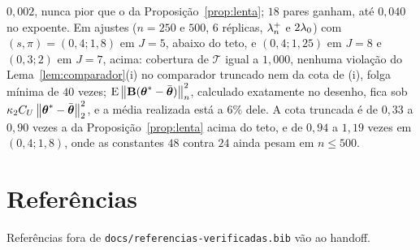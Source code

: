 \documentclass[11pt,a4paper]{article}
\newcommand{\Bmat}{\mathbf{B}}
\newcommand{\thbar}{\bar{\btheta}}
\begin{document}
\begin{itemize}[nosep, leftmargin=*]
    $0{,}002$, nunca pior que o da Proposição~\ref{prop:lenta}; $18$ pares
    ganham, até $0{,}040$ no expoente. Em ajustes ($n = 250$ e $500$, $6$
    réplicas, $\lambda_{n}^{+}$ e $2\lambda_{0}$) com $(s,\pi) = (0{,}4;1{,}8)$ em
    $J = 5$, abaixo do teto, e $(0{,}4;1{,}25)$ em $J = 8$ e $(0{,}3;2)$ em
    $J = 7$, acima: cobertura de $\mathcal{T}$ igual a $1{,}000$, nenhuma
    violação do Lema~\ref{lem:comparador}(i) no comparador truncado nem da
    cota de (i), folga mínima de $40$ vezes; $\E\normn{\Bmat(\thetastar -
    \thbar)}^{2}$, calculado exatamente no desenho, fica sob
    $\kappa_{2}C_{U}\norm{\thetastar - \thbar}_{2}^{2}$, e a média realizada
    está a $6\%$ dele. A cota truncada é de $0{,}33$ a $0{,}90$ vezes a da
    Proposição~\ref{prop:lenta} acima do teto, e de $0{,}94$ a $1{,}19$ vezes
    em $(0{,}4;1{,}8)$, onde as constantes $48$ contra $24$ ainda pesam em
    $n \le 500$.
\end{itemize}

\section*{Referências}
\sloppy

Referências fora de \texttt{docs/referencias-verificadas.bib} vão ao handoff.
\end{document}
